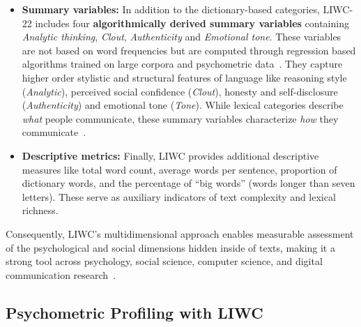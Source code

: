 \begin{itemize}
    \item \textbf{Summary variables:} In addition to the dictionary-based categories, LIWC-22 includes four \textbf{algorithmically derived summary variables} containing \textit{Analytic thinking}, \textit{Clout}, \textit{Authenticity} and \textit{Emotional tone}. These variables are not based on word frequencies but are computed through regression based algorithms trained on large corpora and psychometric data~\cite{pennebaker2022liwc}. They capture higher order stylistic and structural features of language like reasoning style (\textit{Analytic}), perceived social confidence (\textit{Clout}), honesty and self-disclosure (\textit{Authenticity}) and emotional tone (\textit{Tone}). While lexical categories describe \textit{what} people communicate, these summary variables characterize \textit{how} they communicate~\cite{pennebaker2022liwc}.

    \item \textbf{Descriptive metrics:} Finally, LIWC provides additional descriptive measures like total word count, average words per sentence, proportion of dictionary words, and the percentage of “big words” (words longer than seven letters). These serve as auxiliary indicators of text complexity and lexical richness.
\end{itemize}

Consequently,  LIWC's multidimensional approach enables measurable assessment of the psychological and social dimensions hidden inside of texts, making it a strong tool across psychology, social science, computer science, and digital communication research~\cite{pennebaker2022liwc}.


\subsection{Psychometric Profiling with LIWC}

